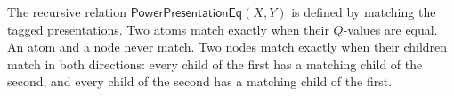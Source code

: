 \begin{definition}
The recursive relation $\mathsf{PowerPresentationEq}(X,Y)$ is defined by
matching the tagged presentations.  Two atoms match exactly when their
$Q$-values are equal.  An atom and a node never match.  Two nodes match
exactly when their children match in both directions: every child of the
first has a matching child of the second, and every child of the second has
a matching child of the first.
\end{definition}
